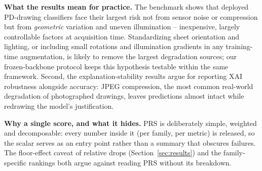 \documentclass[11pt,a4paper]{article}
\begin{document}
\textbf{What the results mean for practice.} The benchmark shows that
deployed PD-drawing classifiers face their largest risk not from sensor noise
or compression but from \emph{geometric} variation and uneven illumination --
inexpensive, largely controllable factors at acquisition time. Standardizing
sheet orientation and lighting, or including small rotations and illumination
gradients in any training-time augmentation, is likely to remove the largest
degradation sources; our frozen-backbone protocol
keeps this hypothesis testable within the same framework. Second, the
explanation-stability results argue for reporting XAI robustness alongside
accuracy: JPEG compression, the most common real-world degradation of
photographed drawings, leaves predictions almost intact while redrawing the
model's justification.

\textbf{Why a single score, and what it hides.} PRS is deliberately simple,
weighted and decomposable: every number inside it (per family, per metric)
is released, so the scalar serves as an entry point rather than a summary
that obscures failures. The floor-effect caveat of relative drops
(Section~\ref{sec:results}) and the family-specific rankings both argue
against reading PRS without its breakdown.
\end{document}
